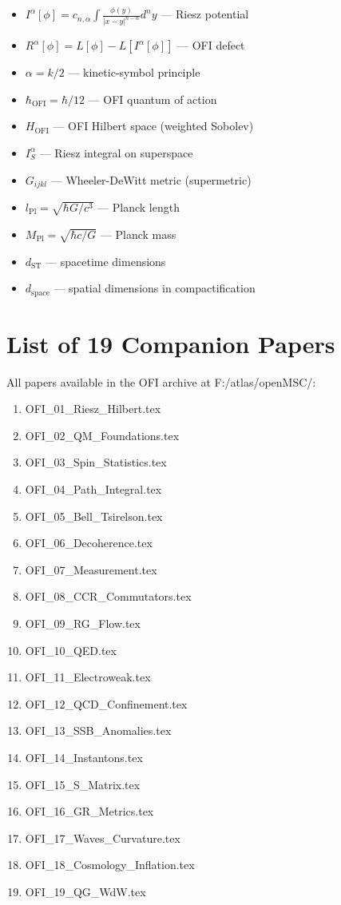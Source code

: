 \documentclass[12pt,a4paper]{article}
\theoremstyle{definition}
\newcommand{\Ialpha}{I^{\alpha}}
\newcommand{\defect}[1]{R^{#1}}
\newcommand{\OFI}{\text{OFI}}
\newcommand{\hbarOFI}{\hbar_{\OFI}}
\begin{document}
\begin{itemize}
\item $\Ialpha[\phi] = c_{n,\alpha} \int \frac{\phi(y)}{|x-y|^{n-\alpha}} d^n y$ — Riesz potential
\item $\defect{\alpha}[\phi] = L[\phi] - L[\Ialpha[\phi]]$ — OFI defect
\item $\alpha = k/2$ — kinetic-symbol principle
\item $\hbarOFI = \hbar/12$ — OFI quantum of action
\item $H_{\OFI}$ — OFI Hilbert space (weighted Sobolev)
\item $\Ialpha_S$ — Riesz integral on superspace
\item $G_{ijkl}$ — Wheeler-DeWitt metric (supermetric)
\item $l_{\text{Pl}} = \sqrt{\hbar G/c^3}$ — Planck length
\item $M_{\text{Pl}} = \sqrt{\hbar c/G}$ — Planck mass
\item $d_{\text{ST}}$ — spacetime dimensions
\item $d_{\text{space}}$ — spatial dimensions in compactification
\end{itemize}

\section{List of 19 Companion Papers}

All papers available in the OFI archive at F:/atlas/openMSC/:

\begin{enumerate}
\item OFI\_01\_Riesz\_Hilbert.tex
\item OFI\_02\_QM\_Foundations.tex
\item OFI\_03\_Spin\_Statistics.tex
\item OFI\_04\_Path\_Integral.tex
\item OFI\_05\_Bell\_Tsirelson.tex
\item OFI\_06\_Decoherence.tex
\item OFI\_07\_Measurement.tex
\item OFI\_08\_CCR\_Commutators.tex
\item OFI\_09\_RG\_Flow.tex
\item OFI\_10\_QED.tex
\item OFI\_11\_Electroweak.tex
\item OFI\_12\_QCD\_Confinement.tex
\item OFI\_13\_SSB\_Anomalies.tex
\item OFI\_14\_Instantons.tex
\item OFI\_15\_S\_Matrix.tex
\item OFI\_16\_GR\_Metrics.tex
\item OFI\_17\_Waves\_Curvature.tex
\item OFI\_18\_Cosmology\_Inflation.tex
\item OFI\_19\_QG\_WdW.tex
\end{enumerate}
\end{document}

